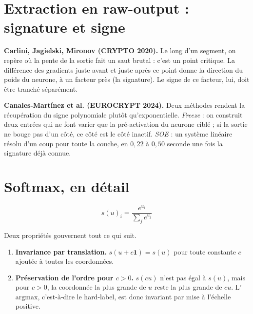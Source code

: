 \documentclass[11pt]{article}
\begin{document}
\section{Extraction en raw-output : signature et signe}

\textbf{Carlini, Jagielski, Mironov (CRYPTO 2020).} Le long d'un segment, on repère où la pente de la sortie fait un saut brutal : c'est un point critique. La différence des gradients juste avant et juste après ce point donne la direction du poids du neurone, à un facteur près (la signature). Le signe de ce facteur, lui, doit être tranché séparément.

\textbf{Canales-Martínez et al. (EUROCRYPT 2024).} Deux méthodes rendent la récupération du signe polynomiale plutôt qu'exponentielle. \emph{Freeze} : on construit deux entrées qui ne font varier que la pré-activation du neurone ciblé ; si la sortie ne bouge pas d'un côté, ce côté est le côté inactif. \emph{SOE} : un système linéaire résolu d'un coup pour toute la couche, en $0{,}22$ à $0{,}50$ seconde une fois la signature déjà connue.

\section{Softmax, en détail}

\[ s(u)_i = \frac{e^{u_i}}{\sum_j e^{u_j}} \]

Deux propriétés gouvernent tout ce qui suit.

\begin{enumerate}
  \item \textbf{Invariance par translation.} $s(u+c\mathbf{1}) = s(u)$ pour toute constante $c$ ajoutée à toutes les coordonnées.
  \item \textbf{Préservation de l'ordre pour $c>0$.} $s(cu)$ n'est pas égal à $s(u)$, mais pour $c>0$, la coordonnée la plus grande de $u$ reste la plus grande de $cu$. L'$\mathrm{argmax}$, c'est-à-dire le hard-label, est donc invariant par mise à l'échelle positive.
\end{enumerate}
\end{document}

